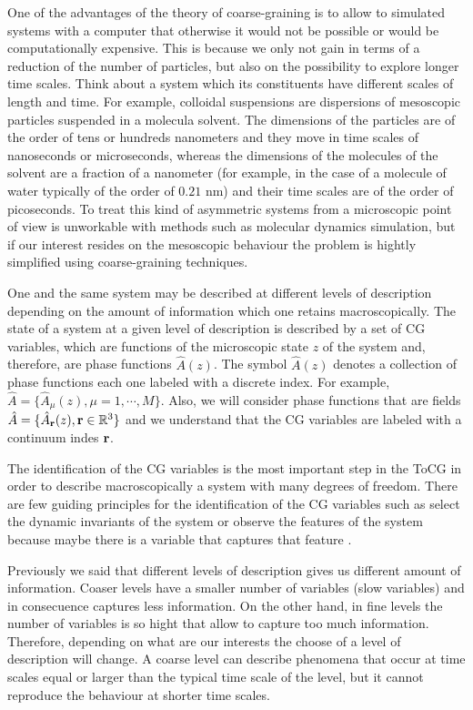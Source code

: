 \documentclass[a4paper,openright,12pt]{book}
\begin{document}
One of the advantages of the theory of coarse-graining is to allow to simulated systems with a computer that otherwise it would not be possible or would be computationally expensive. 
This is because we only not gain in terms of a reduction of the number of particles, but also on the possibility to explore longer time scales. 
Think about a system which its constituents have different scales of length and time.
For example, colloidal suspensions are dispersions of mesoscopic particles suspended in a molecula solvent.
The dimensions of the particles are of the order of tens or hundreds nanometers and they move in time scales of nanoseconds or microseconds, whereas the dimensions of the molecules of the solvent are a fraction of a nanometer (for example, in the case of a molecule of water typically of the order of $0.21$ nm) and their time scales are of the order of picoseconds. To treat this kind of asymmetric systems from a microscopic point of view is unworkable with methods such as molecular dynamics simulation, but if our interest resides on the mesoscopic behaviour the problem is hightly simplified using coarse-graining techniques.    

One and the same system may be described at different levels of description depending on the amount of information which one retains macroscopically. The state of a system at a given level of description is described by a set of CG variables, which are functions of the microscopic state $z$ of the system and, therefore, are phase functions $\hat{A}(z)$. The symbol $\hat{A}(z)$ denotes a collection of phase functions each one labeled with a discrete index. For example, $\hat{A}=\{\hat{A}_{\mu}(z), \mu=1,\cdots, M\}$. Also, we will consider phase functions that are fields $\hat{A}=\{\hat{A}_{\bf r}(z), {\bf r}\in\mathbb{R}^3\}$ and we understand that the CG variables are labeled with a continuum indes ${\bf r}$. 

The identification of the CG variables is the most important step in the ToCG in order to describe macroscopically a system with many degrees of freedom. There are few guiding principles for the identification of the CG variables such as select the dynamic invariants of the system or observe the features of the system because maybe there is a variable that captures that feature \cite{Karttunen2004}.

Previously we said that different levels of description gives us different amount of information. Coaser levels have a smaller number of variables (slow variables) and in consecuence captures less information. On the other hand, in fine levels the number of variables is so hight that allow to capture too much information. Therefore, depending on what are our interests the choose of a level of description will change. A coarse level can describe phenomena that occur at time scales equal or larger than the typical time scale of the level, but it cannot reproduce the behaviour at shorter time scales.
\end{document}
